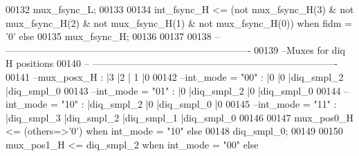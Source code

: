 \begin{DoxyCode}
00132                \textcolor{vhdlchar}{mux_fsync_L};
00133                
00134 \textcolor{vhdlchar}{int_fsync_H} \textcolor{vhdlchar}{<=} \textcolor{vhdlchar}{(}\textcolor{keywordflow}{not} \textcolor{vhdlchar}{mux_fsync_H}\textcolor{vhdlchar}{(}\textcolor{vhdllogic}{}\textcolor{vhdllogic}{3}\textcolor{vhdlchar}{)} \textcolor{vhdlchar}{&} \textcolor{keywordflow}{not} \textcolor{vhdlchar}{mux_fsync_H}\textcolor{vhdlchar}{(}\textcolor{vhdllogic}{}\textcolor{vhdllogic}{2}\textcolor{vhdlchar}{)} \textcolor{vhdlchar}{&} \textcolor{keywordflow}{not} \textcolor{vhdlchar}{mux_fsync_H}\textcolor{vhdlchar}{(}\textcolor{vhdllogic}{}\textcolor{vhdllogic}{1}\textcolor{vhdlchar}{)} \textcolor{vhdlchar}{&} \textcolor{keywordflow}{not} \textcolor{vhdlchar}{
      mux_fsync_H}\textcolor{vhdlchar}{(}\textcolor{vhdllogic}{}\textcolor{vhdllogic}{0}\textcolor{vhdlchar}{)}\textcolor{vhdlchar}{)} \textcolor{keywordflow}{when} \textcolor{vhdlchar}{fidm} \textcolor{vhdlchar}{=} \textcolor{vhdlchar}{'}\textcolor{vhdllogic}{}\textcolor{vhdllogic}{0}\textcolor{vhdlchar}{'} \textcolor{keywordflow}{else} 
00135                \textcolor{vhdlchar}{mux_fsync_H};
00136            
00137 
00138 \textcolor{keyword}{-- ----------------------------------------------------------------------------}
00139 \textcolor{keyword}{--Muxes for diq  H positions}
00140 \textcolor{keyword}{-- ----------------------------------------------------------------------------            }
00141 \textcolor{keyword}{--mux\_posx\_H      : |3            |2          | 1         |0           }
00142 \textcolor{keyword}{--int\_mode = "00" : |0            |0          |diq\_smpl\_2 |diq\_smpl\_0}
00143 \textcolor{keyword}{--int\_mode = "01" : |0            |diq\_smpl\_2 |0          |diq\_smpl\_0}
00144 \textcolor{keyword}{--int\_mode = "10" : |diq\_smpl\_2   |0          |diq\_smpl\_0 |0}
00145 \textcolor{keyword}{--int\_mode = "11" : |diq\_smpl\_3   |diq\_smpl\_2 |diq\_smpl\_1 |diq\_smpl\_0}
00146 
00147 \textcolor{vhdlchar}{mux_pos0_H} \textcolor{vhdlchar}{<=}  \textcolor{vhdlchar}{(}\textcolor{keywordflow}{others}\textcolor{vhdlchar}{=}\textcolor{vhdlchar}{>}\textcolor{vhdlchar}{'}\textcolor{vhdllogic}{}\textcolor{vhdllogic}{0}\textcolor{vhdlchar}{'}\textcolor{vhdlchar}{)} \textcolor{keywordflow}{when} \textcolor{vhdlchar}{int_mode} \textcolor{vhdlchar}{=} \textcolor{vhdllogic}{"10"} \textcolor{keywordflow}{else} 
00148                \textcolor{vhdlchar}{diq_smpl_0};
00149                   
00150 \textcolor{vhdlchar}{mux_pos1_H} \textcolor{vhdlchar}{<=}  \textcolor{vhdlchar}{diq_smpl_2}     \textcolor{keywordflow}{when} \textcolor{vhdlchar}{int_mode} \textcolor{vhdlchar}{=} \textcolor{vhdllogic}{"00"} \textcolor{keywordflow}{else} 

\end{DoxyCode}
